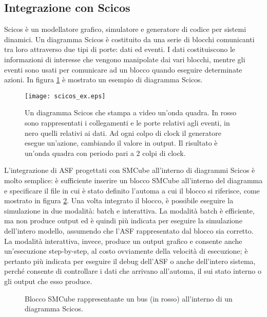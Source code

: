 \subsection{Integrazione con Scicos}
Scicos è un modellatore grafico, simulatore e generatore di codice per sistemi dinamici. Un diagramma Scicos è costituito da una serie di blocchi comunicanti tra loro attraverso due tipi di porte: dati ed eventi. I dati costituiscono le informazioni di interesse che vengono manipolate dai vari blocchi, mentre gli eventi sono usati per comunicare ad un blocco quando eseguire determinate azioni. In figura \ref{Fig:scicos_ex} è mostrato un esempio di diagramma Scicos.\\

\begin{figure}
\centering
\texttt{[image: scicos\_ex.eps]}
\caption{Un diagramma Scicos che stampa a video un'onda quadra. In rosso sono rappresentati i collegamenti e le porte relativi agli eventi, in nero quelli relativi ai dati. Ad ogni colpo di clock il generatore esegue un'azione, cambiando il valore in output. Il risultato è un'onda quadra con periodo pari a 2 colpi di clock.}
\label{Fig:scicos_ex}
\end{figure}

L'integrazione di ASF progettati con SMCube all'interno di diagrammi Scicos è molto semplice: è sufficiente inserire un blocco SMCube all'interno del diagramma e specificare il file in cui è stato definito l'automa a cui il blocco si riferisce, come mostrato in figura \ref{Fig:smcube_scicos_ex}. Una volta integrato il blocco, è possibile eseguire la simulazione in due modalità: batch e interattiva. La modalità batch è efficiente, ma non produce output ed è quindi più indicata per eseguire la simulazione dell'intero modello, assumendo che l'ASF rappresentato dal blocco sia corretto. La modalità interattiva, invece, produce un output grafico e consente anche un'esecuzione step-by-step, al costo ovviamente della velocità di esecuzione; è pertanto più indicata per eseguire il debug dell'ASF o anche dell'intero sistema, perché consente di controllare i dati che arrivano all'automa, il sui stato interno o gli output che esso produce.

\begin{figure}
\centering
{}%
\caption{Blocco SMCube rappresentante un bus (in rosso) all'interno di un diagramma Scicos.}
\label{Fig:smcube_scicos_ex}
\end{figure}